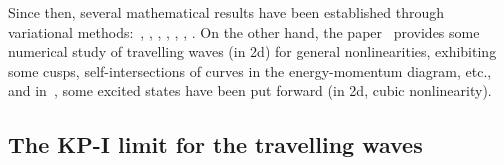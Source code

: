 \documentclass[10pt]{amsart}
\theoremstyle{definition}\newtheorem{defi}[theo]{Definition}\newtheorem{rema}[theo]{Remark}\newtheorem{exam}[theo]{Example}\newtheorem{exem}[theo]{Example}\newtheorem{nota}[theo]{Notation}
\begin{document}
Since then, several mathematical results have been established through variational methods:~\cite[(2d)]{BS99}, \cite[(3d and higher)]{BetOrlSme}, \cite[(3d and higher)]{Cvortexring}, \cite[(2d and 3d)]{BGS2}, \cite{M_exist}, \cite[(2d and higher)]{CM1}, \cite[(2d and 3d)]{Bel_Rui}. On the other hand, the paper~\cite{ChiSch15} provides some numerical study of travelling waves (in 2d) for general nonlinearities, exhibiting some cusps, self-intersections of curves in the energy-momentum diagram, etc., and in~\cite{ChiSch_Morse}, some excited states have been put forward (in 2d, cubic nonlinearity).



\subsection{The KP-I limit for the travelling waves}
\end{document}
